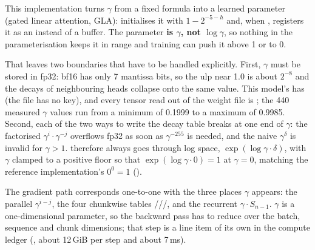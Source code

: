 \documentclass[11pt,openany]{article}
\begin{document}
This implementation turns $\gamma$ from a fixed formula into a learned parameter (gated linear
attention, GLA): \linebreak[0]\linebreak[0]\linebreak[0] initialises it with $1-2^{-5-h}$ and,
when \linebreak[0], registers it as an  instead of a buffer. The
parameter \textbf{is $\gamma$, not $\log\gamma$}, so nothing in the parameterisation keeps it in
range and training can push it above 1 or to 0.

That leaves two boundaries that have to be handled explicitly. First, $\gamma$ must be stored in
fp32: bf16 has only 7 mantissa bits, so the ulp near 1.0 is about $2^{-8}$ and the decays of
neighbouring heads collapse onto the same value. This model's  has 
 (the file has no  key), and every tensor read out of the weight
file is ; the 440 measured $\gamma$ values run from a minimum of 0.1999 to a maximum of
0.9985. Second, each of the two ways to write the decay table breaks at one end of $\gamma$: the
factorised $\gamma^{i}\cdot\gamma^{-j}$ overflows fp32 as soon as $\gamma^{-255}$ is needed, and
the naive $\gamma^{\delta}$ is invalid for $\gamma>1$. \linebreak[0]\linebreak[0]\linebreak[0]
therefore always goes through log space, $\exp(\log\gamma\cdot\delta)$, with $\gamma$ clamped to a
positive floor so that $\exp(\log\gamma\cdot 0)=1$ at $\gamma=0$, matching the reference
implementation's $0^0=1$ (\linebreak[0]\linebreak[0]).

The gradient path corresponds one-to-one with the three places $\gamma$ appears: the parallel
$\gamma^{i-j}$, the four chunkwise tables
///, and the recurrent
$\gamma\cdot S_{n-1}$. $\gamma$ is a one-dimensional parameter, so the backward pass has to reduce
over the batch, sequence and chunk dimensions; that step is a line item of its own in the compute
ledger (, about 12\,GiB per step and about 7\,ms).
\end{document}
